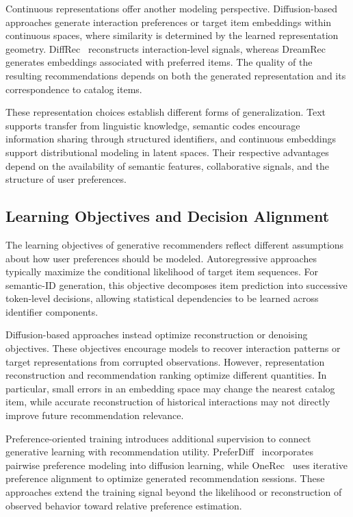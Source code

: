 \documentclass[sigconf,nonacm]{acmart}
\begin{document}
Continuous representations offer another modeling
perspective. Diffusion-based approaches generate
interaction preferences or target item embeddings
within continuous spaces, where similarity is
determined by the learned representation geometry.
DiffRec~\cite{diffrec} reconstructs interaction-level
signals, whereas DreamRec~\cite{dreamrec} generates
embeddings associated with preferred items.
The quality of the resulting recommendations
depends on both the generated representation
and its correspondence to catalog items.

These representation choices establish different
forms of generalization. Text supports transfer
from linguistic knowledge, semantic codes
encourage information sharing through structured
identifiers, and continuous embeddings support
distributional modeling in latent spaces.
Their respective advantages depend on the
availability of semantic features, collaborative
signals, and the structure of user preferences.

\subsection{Learning Objectives and Decision Alignment}

The learning objectives of generative recommenders
reflect different assumptions about how user
preferences should be modeled. Autoregressive
approaches typically maximize the conditional
likelihood of target item sequences. For semantic-ID
generation, this objective decomposes item prediction
into successive token-level decisions, allowing
statistical dependencies to be learned across
identifier components.

Diffusion-based approaches instead optimize
reconstruction or denoising objectives. These
objectives encourage models to recover interaction
patterns or target representations from corrupted
observations. However, representation reconstruction
and recommendation ranking optimize different
quantities. In particular, small errors in an
embedding space may change the nearest catalog
item, while accurate reconstruction of historical
interactions may not directly improve future
recommendation relevance.

Preference-oriented training introduces additional
supervision to connect generative learning with
recommendation utility. PreferDiff~\cite{preferdiff}
incorporates pairwise preference modeling into
diffusion learning, while OneRec~\cite{onerec}
uses iterative preference alignment to optimize
generated recommendation sessions. These
approaches extend the training signal beyond
the likelihood or reconstruction of observed
behavior toward relative preference estimation.
\end{document}
